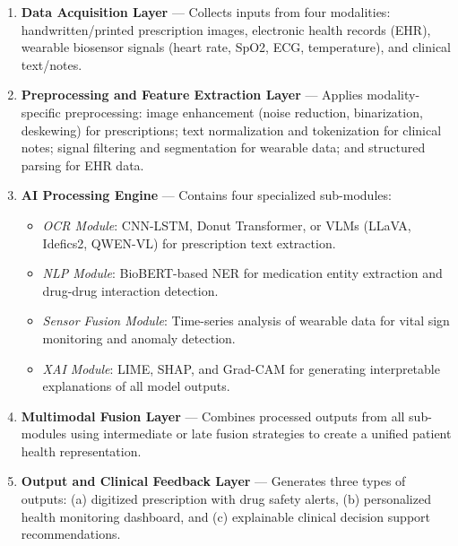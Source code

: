 \documentclass[conference]{IEEEtran}
\begin{document}
\begin{enumerate}[label=\textbf{\arabic*:}]
    \item \textbf{Data Acquisition Layer} --- Collects inputs from four modalities: handwritten/printed prescription images, electronic health records (EHR), wearable biosensor signals (heart rate, SpO2, ECG, temperature), and clinical text/notes.

    \item \textbf{Preprocessing and Feature Extraction Layer} --- Applies modality-specific preprocessing: image enhancement (noise reduction, binarization, deskewing) for prescriptions; text normalization and tokenization for clinical notes; signal filtering and segmentation for wearable data; and structured parsing for EHR data.

    \item \textbf{AI Processing Engine} --- Contains four specialized sub-modules:
    \begin{itemize}
        \item \textit{OCR Module}: CNN-LSTM, Donut Transformer, or VLMs (LLaVA, Idefics2, QWEN-VL) for prescription text extraction.
        \item \textit{NLP Module}: BioBERT-based NER for medication entity extraction and drug-drug interaction detection.
        \item \textit{Sensor Fusion Module}: Time-series analysis of wearable data for vital sign monitoring and anomaly detection.
        \item \textit{XAI Module}: LIME, SHAP, and Grad-CAM for generating interpretable explanations of all model outputs.
    \end{itemize}

    \item \textbf{Multimodal Fusion Layer} --- Combines processed outputs from all sub-modules using intermediate or late fusion strategies to create a unified patient health representation.

    \item \textbf{Output and Clinical Feedback Layer} --- Generates three types of outputs: (a) digitized prescription with drug safety alerts, (b) personalized health monitoring dashboard, and (c) explainable clinical decision support recommendations.
\end{enumerate}
\end{document}

